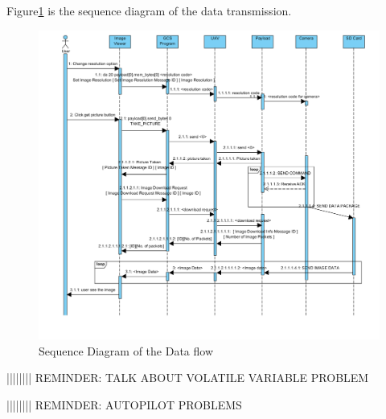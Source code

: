 Figure\ref{sequence diagram} is the sequence diagram of the data transmission.
\begin{figure}[H]
\begin{center}
\includegraphics[width=1.00\textwidth]{figures/sequence_diagram.png} 
\end{center}
\caption{Sequence Diagram of the Data flow\label{sequence diagram}}
\end{figure}


|||||||| REMINDER: TALK ABOUT VOLATILE VARIABLE PROBLEM

|||||||| REMINDER: AUTOPILOT PROBLEMS



